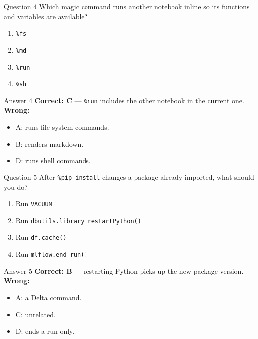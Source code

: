 \documentclass[aspectratio=169,11pt]{beamer}
\begin{document}
\begin{frame}{Question 4}
Which magic command runs another notebook inline so its functions and variables are available?
\begin{enumerate}[label=\Alph*.]
\item \texttt{\%fs}
\item \texttt{\%md}
\item \texttt{\%run}
\item \texttt{\%sh}
\end{enumerate}
\end{frame}
\begin{frame}{Answer 4}
\textbf{Correct: C} --- \texttt{\%run} includes the other notebook in the current one.\\
\vspace{0.5em}
\textbf{Wrong:}
\begin{itemize}
\item A: runs file system commands.
\item B: renders markdown.
\item D: runs shell commands.
\end{itemize}
\end{frame}

\begin{frame}{Question 5}
After \texttt{\%pip install} changes a package already imported, what should you do?
\begin{enumerate}[label=\Alph*.]
\item Run \texttt{VACUUM}
\item Run \texttt{dbutils.library.restartPython()}
\item Run \texttt{df.cache()}
\item Run \texttt{mlflow.end\_run()}
\end{enumerate}
\end{frame}
\begin{frame}{Answer 5}
\textbf{Correct: B} --- restarting Python picks up the new package version.\\
\vspace{0.5em}
\textbf{Wrong:}
\begin{itemize}
\item A: a Delta command.
\item C: unrelated.
\item D: ends a run only.
\end{itemize}
\end{frame}
\end{document}
